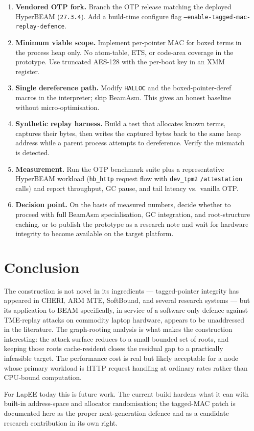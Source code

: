 \documentclass[10pt,a4paper]{article}
\begin{document}
\begin{enumerate}
\item \textbf{Vendored OTP fork.} Branch the OTP release matching the
deployed HyperBEAM (\texttt{27.3.4}). Add a build-time configure flag
\texttt{--enable-tagged-mac-replay-defence}.
\item \textbf{Minimum viable scope.} Implement per-pointer MAC for
boxed terms in the process heap only. No atom-table, ETS, or code-area
coverage in the prototype. Use truncated AES-128 with the per-boot key
in an XMM register.
\item \textbf{Single dereference path.} Modify \texttt{HALLOC} and the
boxed-pointer-deref macros in the interpreter; skip BeamAsm. This
gives an honest baseline without micro-optimisation.
\item \textbf{Synthetic replay harness.} Build a test that allocates
known terms, captures their bytes, then writes the captured bytes back
to the same heap address while a parent process attempts to dereference.
Verify the mismatch is detected.
\item \textbf{Measurement.} Run the OTP benchmark suite plus a
representative HyperBEAM workload (\texttt{hb\_http} request flow with
\texttt{dev\_tpm2} \texttt{/attestation} calls) and report throughput,
GC pause, and tail latency vs.\ vanilla OTP.
\item \textbf{Decision point.} On the basis of measured numbers, decide
whether to proceed with full BeamAsm specialisation, GC integration,
and root-structure caching, or to publish the prototype as a research
note and wait for hardware integrity to become available on the
target platform.
\end{enumerate}

\section{Conclusion}

The construction is not novel in its ingredients --- tagged-pointer
integrity has appeared in CHERI, ARM MTE, SoftBound, and several
research systems --- but its application to BEAM specifically, in
service of a software-only defence against TME-replay attacks on
commodity laptop hardware, appears to be unaddressed in the literature.
The graph-rooting analysis is what makes the construction interesting:
the attack surface reduces to a small bounded set of roots, and
keeping those roots cache-resident closes the residual gap to a
practically infeasible target. The performance cost is real but
likely acceptable for a node whose primary workload is HTTP request
handling at ordinary rates rather than CPU-bound computation.

For LapEE today this is future work. The current build hardens what
it can with built-in address-space and allocator randomisation; the
tagged-MAC patch is documented here as the proper next-generation
defence and as a candidate research contribution in its own right.
\end{document}
